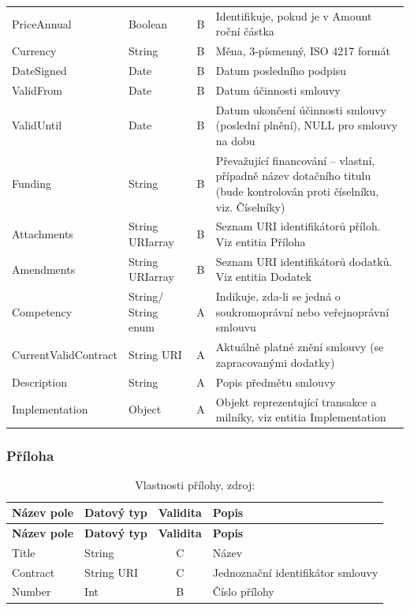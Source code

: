 \begin{center}
\begin{longtable}{lp{20mm}cp{65mm}}
\rowcolor{validateB}PriceAnnual & Boolean & B & Identifikuje, pokud je v Amount roční částka \\
\rowcolor{validateB}Currency & String & B & Měna, 3-písmenný, ISO 4217 formát \\
\rowcolor{validateB}DateSigned & Date & B & Datum posledního podpisu \\
\rowcolor{validateB}ValidFrom & Date & B & Datum účinnosti smlouvy \\
\rowcolor{validateB}ValidUntil & Date & B & Datum ukončení účinnosti smlouvy (poslední plnění), NULL pro smlouvy na dobu \\
\rowcolor{validateB}Funding & String & B & Převažující financování – vlastní, případně název dotačního titulu (bude kontrolován proti číselníku, viz. Číselníky) \\
\rowcolor{validateB}Attachments & String URIarray & B & Seznam URI identifikátorů příloh. Viz entitia Příloha \\
\rowcolor{validateB}Amendments & String URIarray & B & Seznam URI identifikátorů dodatků. Viz entitia Dodatek \\
\rowcolor{validateA}Competency & String/ String enum & A & Indikuje, zda-li se jedná o soukromoprávní nebo veřejnoprávní smlouvu \\
\rowcolor{validateA}CurrentValidContract & String URI & A & Aktuálně platné znění smlouvy (se zapracovanými dodatky) \\
\rowcolor{validateA}Description & String & A & Popis předmětu smlouvy \\
\rowcolor{validateA}Implementation & Object & A & Objekt reprezentující transakce a milníky, viz entitia Implementation \\
\end{longtable}
\end{center}

\subsubsection*{Příloha}

\begin{center}
\begin{longtable}{lp{20mm}cp{65mm}}
\label{grid_mlmmh} \\
\multicolumn{1}{l}{\textbf{Název pole}} & 
\multicolumn{1}{l}{\textbf{Datový typ}} & 
\multicolumn{1}{l}{\textbf{Validita}} & 
\multicolumn{1}{l}{\textbf{Popis}} \\ \hline 
\endfirsthead
\multicolumn{1}{l}{\textbf{Název pole}} & 
\multicolumn{1}{l}{\textbf{Datový typ}} & 
\multicolumn{1}{l}{\textbf{Validita}} & 
\multicolumn{1}{l}{\textbf{Popis}} \\ \hline 
\hline
\endhead
\endfoot
\caption{Vlastnosti přílohy, zdroj:\protect\cite{metodika}}
\endlastfoot
\rowcolor{validateC}Title & String & C & Název \\
\rowcolor{validateC}Contract & String URI & C & Jednoznační identifikátor smlouvy \\
\rowcolor{validateB}Number & Int & B & Číslo přílohy \\
\end{longtable}
\end{center}

